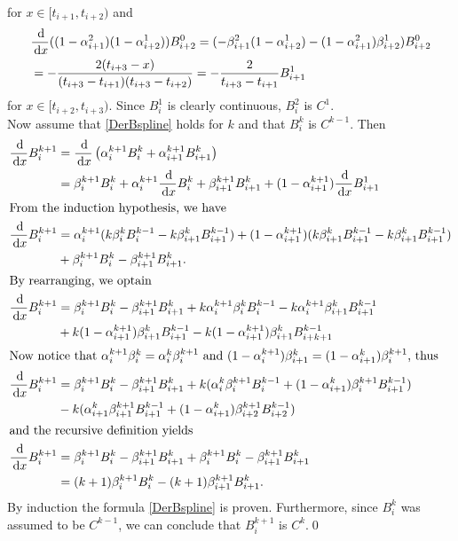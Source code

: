 for $x\in [t_{i+1},t_{i+2})$ and
\begin{align}
  &\frac{\,{\rm d}}{\,{\rm d} x} ((1-\alpha_{i+1}^2)(1-\alpha_{i+2}^1))B_{i+2}^0 = (-\beta_{i+1}^2(1-\alpha_{i+2}^1) -(1-\alpha_{i+1}^2)\beta_{i+2}^1)B_{i+2}^0\\
  &= - \frac{2(t_{i+3}-x)}{(t_{i+3}-t_{i+1})(t_{i+3}-t_{i+2})} = -\frac{2}{t_{i+3}-t_{i+1}}B_{i+1}^1
\end{align}
for $x\in [t_{i+2},t_{i+3})$. Since $B_i^1$ is clearly continuous, $B_i^2$ is $C^{1}$.\\

Now assume that \eqref{DerBspline} holds for $k$ and that $B_i^k$ is $C^{k-1}$. Then 
\begin{align}
  \frac{\,{\rm d}}{\,{\rm d} x} B_i^{k+1} &= \frac{\,{\rm d}}{\,{\rm d} x} \left(\alpha_i^{k+1} B_i^k + \alpha_{i+1}^{k+1}B_{i+1}^k\right)\\
  &= \beta_i^{k+1} B_i^k + \alpha_i^{k+1} \frac{\,{\rm d}}{\,{\rm d} x}B_i^k + \beta_{i+1}^{k+1} B_{i+1}^k + (1-\alpha_{i+1}^{k+1}) \frac{\,{\rm d}}{\,{\rm d} x}B_{i+1}^1\\
  \intertext{From the induction hypothesis, we have}
  \frac{\,{\rm d}}{\,{\rm d} x} B_i^{k+1} &= \alpha_i^{k+1}(k\beta_i^{k}B_i^{k-1} - k\beta_{i+1}^{k}B_{i+1}^{k-1}) + (1-\alpha_{i+1}^{k+1})(k\beta_{i+1}^{k}B_{i+1}^{k-1} - k\beta_{i+1}^k B_{i+1}^{k-1})\\
  &+ \beta_i^{k+1}B_i^k - \beta_{i+1}^{k+1}B_{i+1}^k.\\
  \intertext{By rearranging, we optain}
  \frac{\,{\rm d}}{\,{\rm d} x} B_i^{k+1} &= \beta_i^{k+1} B_i^k - \beta_{i+1}^{k+1}B_{i+1}^k + k\alpha_i^{k+1}\beta_i^kB_i^{k-1} - k\alpha_i^{k+1}\beta_{i+1}^kB_{i+1}^{k-1}\\
  &+ k(1-\alpha_{i+1}^{k+1})\beta_{i+1}^kB_{i+1}^{k-1} - k(1-\alpha_{i+1}^{k+1})\beta_{i+1}^kB_{i+{k+1}}^{k-1}\\
  \intertext{Now notice that $\alpha_i^{k+1}\beta_i^{k} = \alpha_i^{k}\beta_i^{k+1}$ and $(1-\alpha_i^{k+1})\beta_{i+1}^{k} = (1-\alpha_{i+1}^{k})\beta_{i}^{k+1}$, thus}
  \frac{\,{\rm d}}{\,{\rm d} x} B_i^{k+1} &= \beta_i^{k+1} B_i^k - \beta_{i+1}^{k+1}B_{i+1}^k + k(\alpha_i^k\beta_i^{k+1}B_i^{k-1} + (1-\alpha_{i+1}^k)\beta_{i}^{k+1}B_{i+1}^{k-1})\\
  &- k(\alpha_{i+1}^k\beta_{i+1}^{k+1}B_{i+1}^{k-1} + (1-\alpha_{i+1}^k)\beta_{i+2}^{k+1}B_{i+2}^{k-1})\\
  \intertext{and the recursive definition yields}
  \frac{\,{\rm d}}{\,{\rm d} x} B_i^{k+1} &= \beta_i^{k+1} B_i^k - \beta_{i+1}^{k+1}B_{i+1}^k + \beta_{i}^{k+1}B_i^k - \beta_{i+1}^{k+1} B_{i+1}^k\\
  &= (k+1)\beta_{i}^{k+1}B_i^k - (k+1)\beta_{i+1}^{k+1} B_{i+1}^k.
\end{align}
By induction the formula \eqref{DerBspline} is proven. Furthermore, since $B_i^k$ was assumed to be $C^{k-1}$, we can conclude that $B_i^{k+1}$ is $C^k$.\hfill\qed\\

